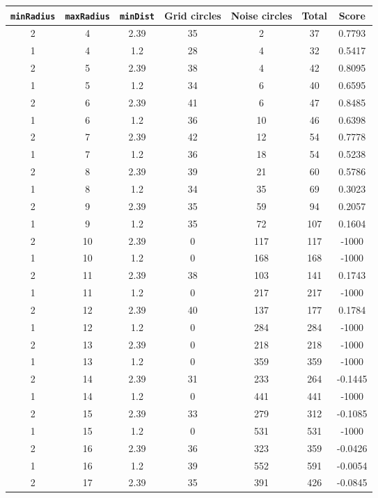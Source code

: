 \documentclass[letterpaper, 12pt]{article}
\begin{document}
\begin{longtable}{|c|c|c|c|c|c|c|}
\hline
\textbf{\texttt{minRadius}} & \textbf{\texttt{maxRadius}} & \textbf{\texttt{minDist}} & \textbf{Grid circles} & \textbf{Noise circles} & \textbf{Total} & \textbf{Score} \\
\hline
2 & 4 & 2.39 & 35 & 2 & 37 & 0.7793 \\
\hline
1 & 4 & 1.2 & 28 & 4 & 32 & 0.5417 \\
\hline
2 & 5 & 2.39 & 38 & 4 & 42 & 0.8095 \\
\hline
1 & 5 & 1.2 & 34 & 6 & 40 & 0.6595 \\
\hline
2 & 6 & 2.39 & 41 & 6 & 47 & 0.8485 \\
\hline
1 & 6 & 1.2 & 36 & 10 & 46 & 0.6398 \\
\hline
2 & 7 & 2.39 & 42 & 12 & 54 & 0.7778 \\
\hline
1 & 7 & 1.2 & 36 & 18 & 54 & 0.5238 \\
\hline
2 & 8 & 2.39 & 39 & 21 & 60 & 0.5786 \\
\hline
1 & 8 & 1.2 & 34 & 35 & 69 & 0.3023 \\
\hline
2 & 9 & 2.39 & 35 & 59 & 94 & 0.2057 \\
\hline
1 & 9 & 1.2 & 35 & 72 & 107 & 0.1604 \\
\hline
2 & 10 & 2.39 & 0 & 117 & 117 & -1000 \\
\hline
1 & 10 & 1.2 & 0 & 168 & 168 & -1000 \\
\hline
2 & 11 & 2.39 & 38 & 103 & 141 & 0.1743 \\
\hline
1 & 11 & 1.2 & 0 & 217 & 217 & -1000 \\
\hline
2 & 12 & 2.39 & 40 & 137 & 177 & 0.1784 \\
\hline
1 & 12 & 1.2 & 0 & 284 & 284 & -1000 \\
\hline
2 & 13 & 2.39 & 0 & 218 & 218 & -1000 \\
\hline
1 & 13 & 1.2 & 0 & 359 & 359 & -1000 \\
\hline
2 & 14 & 2.39 & 31 & 233 & 264 & -0.1445 \\
\hline
1 & 14 & 1.2 & 0 & 441 & 441 & -1000 \\
\hline
2 & 15 & 2.39 & 33 & 279 & 312 & -0.1085 \\
\hline
1 & 15 & 1.2 & 0 & 531 & 531 & -1000 \\
\hline
2 & 16 & 2.39 & 36 & 323 & 359 & -0.0426 \\
\hline
1 & 16 & 1.2 & 39 & 552 & 591 & -0.0054 \\
\hline
2 & 17 & 2.39 & 35 & 391 & 426 & -0.0845 \\

\end{longtable}
\end{document}

